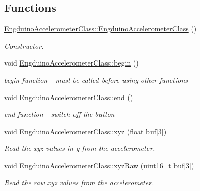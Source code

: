 \subsection*{Functions}
\begin{DoxyCompactItemize}
\item 
\hyperlink{group___engduino_accelerometer_gabd01eb4c2e42c23a45d098c424818a54}{Engduino\+Accelerometer\+Class\+::\+Engduino\+Accelerometer\+Class} ()
\begin{DoxyCompactList}\small\item\em Constructor. \end{DoxyCompactList}\item 
void \hyperlink{group___engduino_accelerometer_ga1267f368f111656af2dfcfd252096983}{Engduino\+Accelerometer\+Class\+::begin} ()
\begin{DoxyCompactList}\small\item\em begin function -\/ must be called before using other functions \end{DoxyCompactList}\item 
void \hyperlink{group___engduino_accelerometer_gaa63eadbabe2812225ceb7a4427eae2e1}{Engduino\+Accelerometer\+Class\+::end} ()
\begin{DoxyCompactList}\small\item\em end function -\/ switch off the button \end{DoxyCompactList}\item 
void \hyperlink{group___engduino_accelerometer_ga2f8b224cebb17ba5f17b3cac836498d1}{Engduino\+Accelerometer\+Class\+::xyz} (float buf\mbox{[}3\mbox{]})
\begin{DoxyCompactList}\small\item\em Read the xyz values in g from the accelerometer. \end{DoxyCompactList}\item 
void \hyperlink{group___engduino_accelerometer_gaf0aa7528ab8899701428fac56ea7013a}{Engduino\+Accelerometer\+Class\+::xyz\+Raw} (uint16\+\_\+t buf\mbox{[}3\mbox{]})
\begin{DoxyCompactList}\small\item\em Read the raw xyz values from the accelerometer. \end{DoxyCompactList}\end{DoxyCompactItemize}
